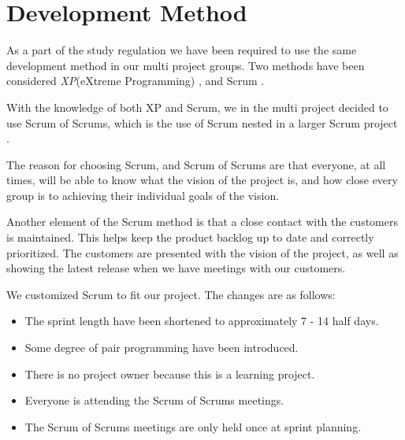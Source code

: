 \section{Development Method}

As a part of the study regulation we have been required to use the same development method in our multi project groups. Two methods have been considered \textit{XP}(eXtreme Programming) \cite{XP}, and Scrum \cite{SCRUM}.

With the knowledge of both XP and Scrum, we in the multi project decided to use Scrum of Scrums, which is the use of Scrum nested in a larger Scrum project \cite{ScrumOfScrums}.

The reason for choosing Scrum, and Scrum of Scrums are that everyone, at all times, will be able to know what the vision of the project is, and how close every group is to achieving their individual goals of the vision.

Another element of the Scrum method is that a close contact with the customers is maintained. This helps keep the product backlog up to date and correctly prioritized. The customers are presented with the vision of the project, as well as showing the latest release when we have meetings with our customers.

We customized Scrum to fit our project. The changes are as follows:
\begin{itemize}
	\item The sprint length have been shortened to approximately 7 - 14 half days.
	\item Some degree of pair programming have been introduced.
	\item There is no project owner because this is a learning project.
	\item Everyone is attending the Scrum of Scrums meetings.
	\item The Scrum of Scrums meetings are only held once at sprint planning.
\end{itemize}